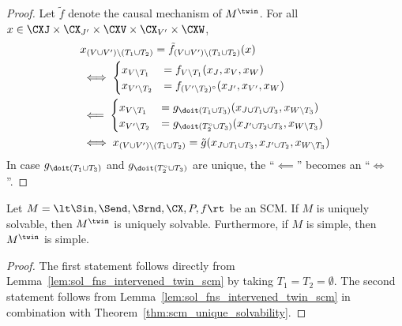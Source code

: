 \begin{proof}
Let $\tilde{f}$ denote the causal mechanism of $M^\twin$.
For all $x \in \CXJ \times \CX_{J'} \times \CXV \times \CX_{V'} \times \CXW$,
  \begin{equation*}\begin{split}
    & x_{(V \cup V') \setminus (T_1 \cup T_2)} = \tilde{f}_{(V \cup V') \setminus (T_1 \cup T_2)}(x) \\
    & \iff \begin{cases}
      x_{V\setminus T_1}  &= f_{V\setminus T_1}(x_J,x_V,x_W) \\
      x_{V'\setminus T_2} &= f_{(V'\setminus T_2)^\circ}(x_{J'},x_{V'},x_W)
    \end{cases} \\
    & \impliedby \begin{cases}
      x_{V\setminus T_1} &= g_{\doit(T_1\cup T_3)}(x_{J\cup T_1\cup T_3},x_{W\setminus T_3}) \\
      x_{V'\setminus T_2} &= g_{\doit(T_2^\circ \cup T_3)}(x_{J'\cup T_2 \cup T_3},x_{W\setminus T_3})
    \end{cases}\\
    & \iff 
    x_{(V \cup V') \setminus (T_1 \cup T_2)} = \tilde{g}(x_{J \cup T_1 \cup T_3}, x_{J' \cup T_2}, x_{W \setminus T_3})
  \end{split}\end{equation*}
In case $g_{\doit(T_1 \cup T_3)}$ and $g_{\doit(T_2^\circ \cup T_3)}$ are unique, the ``$\impliedby$'' becomes an ``$\iff$''.
\end{proof}
\begin{Prp}
Let $M = \lt \Sin, \Send, \Srnd, \CX, P, f \rt$ be an SCM.
If $M$ is uniquely solvable, then $M^{\twin}$ is uniquely solvable.
Furthermore, if $M$ is simple, then $M^{\twin}$ is simple.
\end{Prp}
\begin{proof}
  The first statement follows directly from Lemma~\ref{lem:sol_fns_intervened_twin_scm} by taking $T_1 = T_2 = \emptyset$.
  The second statement follows from Lemma~\ref{lem:sol_fns_intervened_twin_scm} in combination with
  Theorem~\ref{thm:scm_unique_solvability}.
\end{proof}

